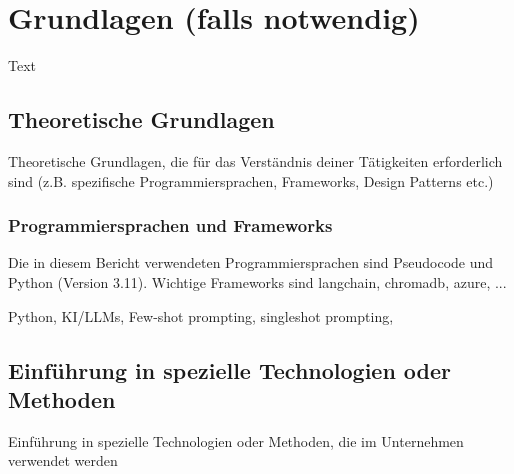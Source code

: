 \chapter{Grundlagen (falls notwendig)}
Text 

\section{Theoretische Grundlagen}
Theoretische Grundlagen, die für das Verständnis deiner Tätigkeiten erforderlich sind 
(z.B. spezifische Programmiersprachen, Frameworks, Design Patterns etc.)

\subsection{Programmiersprachen und Frameworks}
Die in diesem Bericht verwendeten Programmiersprachen sind Pseudocode und Python (Version 3.11).
Wichtige Frameworks sind langchain, chromadb, azure, ...


Python, KI/LLMs, Few-shot prompting, singleshot prompting, 

\section{Einführung in spezielle Technologien oder Methoden}
Einführung in spezielle Technologien oder Methoden, die im Unternehmen verwendet werden


